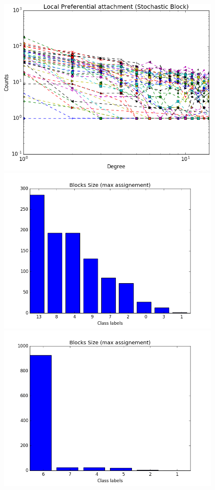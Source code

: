 \documentclass[a4paper, 12pt]{article}
\begin{document}
\begin{figure}[ht]
	\endminipage
	\includegraphics[scale=0.27]{img/M_g_regular/figure_3}
	\endminipage
		\vspace{-0.28cm}
	\includegraphics[scale=0.27]{img/M_g_peaks/figure_5}
	\endminipage
	\includegraphics[scale=0.27]{img/M_g_power_law/figure_5} 

\end{figure}
\end{document}
